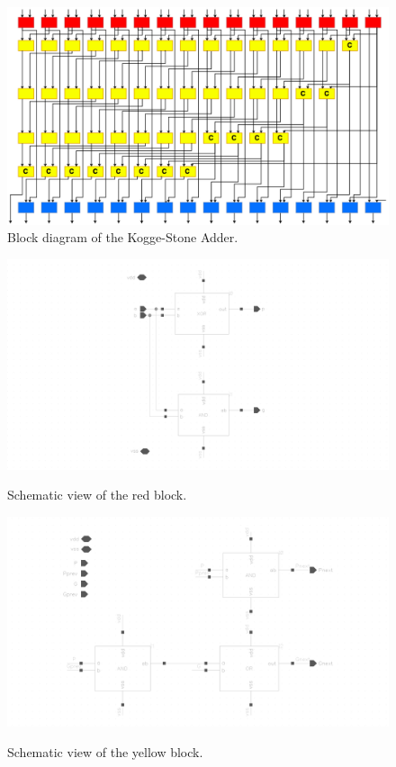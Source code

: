 \begin{figure}[H]
  \centering
  \captionsetup{justification=centering}
  \includegraphics[scale=0.5, angle=90]{../figures/ks_block}
  \caption{Block diagram of the Kogge-Stone Adder.} \label{fig:ks_block}
\end{figure}

\begin{figure}[H]
  \centering
  \captionsetup{justification=centering}
  {\includegraphics[width=2.0\textwidth]{../figures/red}}
  \caption{Schematic view of the red block.} \label{fig:red}
\end{figure}

\begin{figure}[H]
  \centering
  \captionsetup{justification=centering}
  {\includegraphics[width=1.3\textwidth]{../figures/yellow}}
  \caption{Schematic view of the yellow block.} \label{fig:yellow}
\end{figure}

